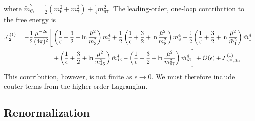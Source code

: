 %
where
$
\tilde m_{67}^2 = \frac{1}{2}(m_6^2 + m_7^2) + \frac{1}{4} m_{67}^2.
$
The leading-order, one-loop contribution to the free energy is
%
\begin{align}
    \label{one-loop free energy}
    \nonumber
    \mathcal{F}^{(1)}_2
    =
    -\frac{1}{2} \frac{  \mu^{-2\epsilon}}{(4 \pi)^2} 
    \Bigg[&
        \left(
            \frac{1}{\epsilon} + \frac{3}{2} + \ln\frac{\tilde \mu^2}{m_3^2}
        \right)
        m_3^4
        +
        \frac{1}{2}
        \left(
            \frac{1}{\epsilon} + \frac{3}{2} + \ln\frac{\tilde \mu^2}{m_8^2} 
        \right)
        m_8^4+
        \frac{1}{2}
        \left(
            \frac{1}{\epsilon} + \frac{3}{2} + \ln\frac{\tilde \mu^2}{\tilde m_1^2}
        \right)
        \tilde m_1^4 \\ \nonumber
        & +
        \left(
            \frac{1}{\epsilon} + \frac{3}{2} + \ln\frac{\tilde \mu^2}{\tilde m_{45}^2}
        \right)
        \tilde m_{45}^4
        +
        \left(
            \frac{1}{\epsilon} + \frac{3}{2} + \ln\frac{\tilde \mu^2}{\tilde m_{67}^2} 
        \right)
        \tilde m_{67}^4
    \Bigg]
    + \mathcal O(\epsilon)
    + \mathcal{F}^{(1)}_{{\pi^\pm},\text{fin}}
\end{align}
%
This contribution, however, is not finite as $\epsilon\rightarrow 0$.
We must therefore include couter-terms from the higher order Lagrangian.


\subsection{Renormalization}


